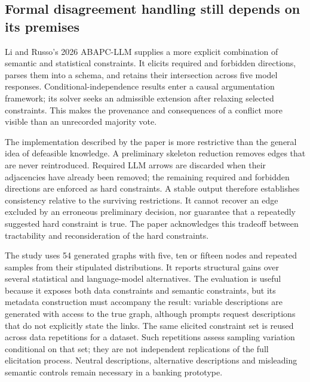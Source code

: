 \hypertarget{formal-disagreement-handling-still-depends-on-its-premises}{%
\subsection{Formal disagreement handling still depends on its
premises}\label{formal-disagreement-handling-still-depends-on-its-premises}}

Li and Russo's 2026 ABAPC-LLM supplies a more explicit combination of
semantic and statistical constraints. It elicits required and forbidden
directions, parses them into a schema, and retains their intersection
across five model responses. Conditional-independence results enter a
causal argumentation framework; its solver seeks an admissible extension
after relaxing selected constraints. This makes the provenance and
consequences of a conflict more visible than an unrecorded majority
vote. \citep{exec14_expert_argumentation}

The implementation described by the paper is more restrictive than the
general idea of defeasible knowledge. A preliminary skeleton reduction
removes edges that are never reintroduced. Required LLM arrows are
discarded when their adjacencies have already been removed; the
remaining required and forbidden directions are enforced as hard
constraints. A stable output therefore establishes consistency relative
to the surviving restrictions. It cannot recover an edge excluded by an
erroneous preliminary decision, nor guarantee that a repeatedly
suggested hard constraint is true. The paper acknowledges this tradeoff
between tractability and reconsideration of the hard constraints.
\citep{exec14_expert_argumentation}

The study uses 54 generated graphs with five, ten or fifteen nodes and
repeated samples from their stipulated distributions. It reports
structural gains over several statistical and language-model
alternatives. The evaluation is useful because it exposes both data
constraints and semantic constraints, but its metadata construction must
accompany the result: variable descriptions are generated with access to
the true graph, although prompts request descriptions that do not
explicitly state the links. The same elicited constraint set is reused
across data repetitions for a dataset. Such repetitions assess sampling
variation conditional on that set; they are not independent replications
of the full elicitation process. Neutral descriptions, alternative
descriptions and misleading semantic controls remain necessary in a
banking prototype. \citep{exec14_expert_argumentation}

